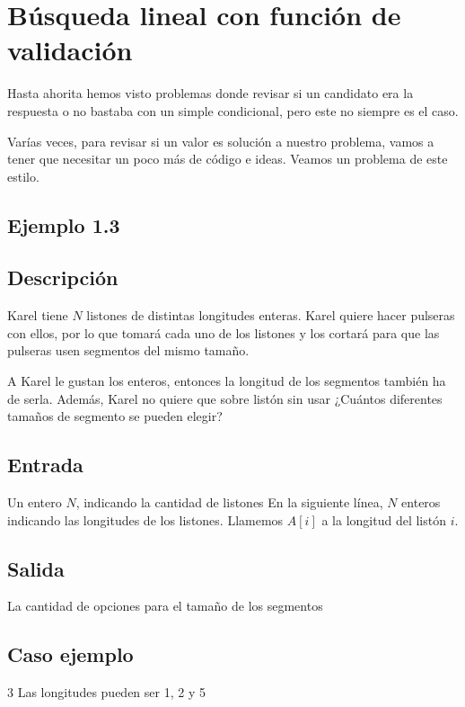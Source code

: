 \section{Búsqueda lineal con función de validación}

Hasta ahorita hemos visto problemas donde revisar si un candidato era la respuesta o no bastaba con un simple condicional, pero este no siempre es el caso.

Varías veces, para revisar si un valor es solución a nuestro problema, vamos a tener que necesitar un poco más de código e ideas. Veamos un problema de este estilo.

\subsection{Ejemplo 1.3}

\subsection*{Descripción}
Karel tiene \(N\) listones de distintas longitudes enteras. Karel quiere hacer pulseras con ellos, por lo que tomará cada uno de los listones y los cortará para que las pulseras usen segmentos del mismo tamaño.

A Karel le gustan los enteros, entonces la longitud de los segmentos también ha de serla. Además, Karel no quiere que sobre listón sin usar ¿Cuántos diferentes tamaños de segmento se pueden elegir?

\subsection*{Entrada}
Un entero \(N\), indicando la cantidad de listones
En la siguiente línea, \(N\) enteros indicando las longitudes de los listones. Llamemos \(A[i]\) a la longitud del listón \(i\).

\subsection*{Salida}
La cantidad de opciones para el tamaño de los segmentos

\subsection*{Caso ejemplo}
\begin{casebox3}
	{3}
	{Las longitudes pueden ser 1, 2 y 5}
\end{casebox3}	
